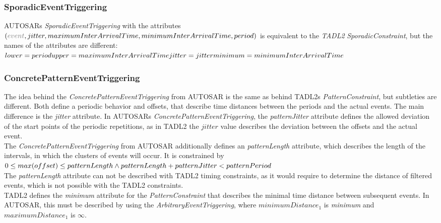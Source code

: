 	\subsubsection{SporadicEventTriggering}
		AUTOSARs \emph{SporadicEventTriggering} with the attributes\\
		 $(\textcolor{gray}{event}, jitter, maximumInterArrivalTime,  minimumInterArrivalTime, period)$ is equivalent to the \emph{TADL2} \emph{SporadicConstraint}, but the names of the attributes are different:\\
		\begin{math}
			lower=period\\
			upper=maximumInterArrivalTime\\
			jitter=jitter\\
			minimum=minimumInterArrivalTime
		\end{math}
	
	\subsubsection{ConcretePatternEventTriggering}
		The idea behind the \emph{ConcretePatternEventTriggering} from AUTOSAR is the same as behind TADL2s \emph{PatternConstraint}, but subtleties are different. Both define a periodic behavior and offsets, that describe time distances between the periods and the actual events. The main difference is the \emph{jitter} attribute. In AUTOSARs \emph{ConcretePatternEventTriggering}, the \emph{patternJitter} attribute defines the allowed deviation of the start points of the periodic repetitions, as in TADL2 the $jitter$ value describes the deviation between the offsets and the actual event.\\
		The \emph{ConcretePatternEventTriggering} from AUTOSAR additionally defines an \emph{patternLength} attribute, which describes the length of the intervals, in which the clusters of events will occur. It is constrained by\\[10pt]
		\begin{math}
			0\leq max(offset)\leq patternLength\\
			\land patternLength + patternJitter < patternPeriod
		\end{math}\\[10pt]
		The \emph{patternLength} attribute can not be described with TADL2 timing constraints, as it would require to determine the distance of filtered events, which is not possible with the TADL2 constraints.\\
		TADL2 defines the \emph{minimum} attribute for the \emph{PatternConstraint} that describes the minimal time distance between subsequent events. In AUTOSAR, this must be described by using the \emph{ArbitraryEventTriggering}, where $minimumDistance_1$ is \emph{minimum} and $maximumDistance_1$ is $\infty$.
		
